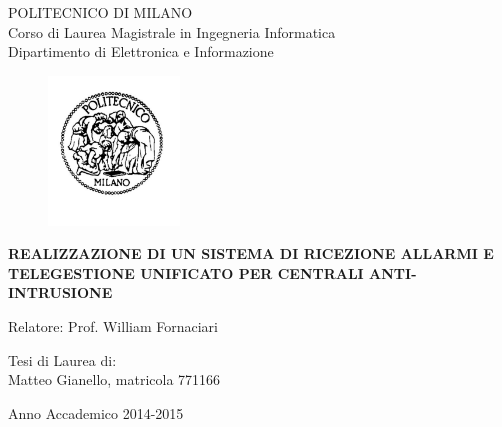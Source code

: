 \thispagestyle{empty}
\vspace*{-1.5cm} \bfseries{
\begin{center}
  \large
  POLITECNICO DI MILANO\\
  \normalsize
  Corso di Laurea Magistrale in Ingegneria Informatica\\
  Dipartimento di Elettronica e Informazione\\
  \begin{figure}[htbp]
    \begin{center}
      \includegraphics[width=3.5cm]{pictures/logopm}
    \end{center}
  \end{figure}
  \vspace*{0.3cm} \LARGE



  \textbf{REALIZZAZIONE DI UN SISTEMA DI RICEZIONE ALLARMI E TELEGESTIONE UNIFICATO PER CENTRALI ANTI-INTRUSIONE}\\



  \vspace*{.75truecm} \large
\end{center}
\vspace*{3.0cm} \large
\begin{flushleft}


  Relatore: Prof. William Fornaciari \\

\end{flushleft}
\vspace*{1.0cm}
\begin{flushright}


  Tesi di Laurea di:\\ Matteo Gianello, matricola 771166


\end{flushright}
\vspace*{0.5cm}
\begin{center}



  Anno Accademico 2014-2015
\end{center} \clearpage
}
